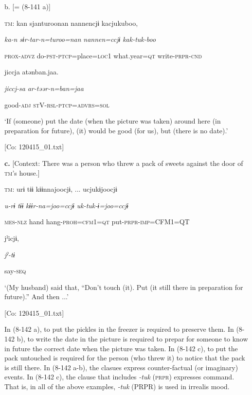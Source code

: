   b.  [= (8-141 a)]

    \textsc{tm}:  kan  sjanturoonan  {\textbar}nannen{\textbar}cjɨ  kacjukuboo,

      \textit{ka-n}  \textit{sɨr-tar-n=turoo=nan}  \textit{nannen=ccjɨ}  \textit{kak-tuk{}-boo}

      \textsc{prox}-\textsc{advz}  do-\textsc{pst}-\textsc{ptcp}=place=\textsc{loc}1  what.year=\textsc{qt}  write-\textsc{prpr}-\textsc{cnd}

      jiccja  atənban.jaa.  

      \textit{jiccj-sa}  \textit{ar-təər-n=ban=jaa}  

      good-\textsc{adj}  \textsc{st}V-\textsc{rsl}-\textsc{ptcp}=\textsc{advrs}=\textsc{sol}

      ‘If (someone) put the date (when the picture was taken) around here (in preparation for future), (it) would be good (for us), but (there is no date).’

      [Co: 120415\_01.txt]

  \textbf{c.}  [Context: There was a person who threw a pack of sweets against the door of \textsc{tm}’s house.]

    \textsc{tm}:  urɨ  tɨɨ  kɨɨnnajoocjɨ, ...  ucjukɨjoocjɨ

      \textit{u-rɨ}  \textit{tɨɨ}  \textit{kɨɨr-na=joo=ccjɨ}  \textit{uk-tuk{}-ɨ=joo=ccjɨ}

      \textsc{mes}-\textsc{nlz}  hand  hang-\textsc{proh}=\textsc{cfm}1=\textsc{qt}  put-\textsc{prpr}-\textsc{imp}=CFM1=QT

      jˀicjɨ,      

      \textit{jˀ-tɨ}      

      say-\textsc{seq}

      ‘(My husband) said that, “Don’t touch (it). Put (it still there in preparation for future).” And then ...’

      [Co: 120415\_01.txt]

In (8-142 a), to put the pickles in the freezer is required to preserve them. In (8-142 b), to write the date in the picture is required to prepar for someone to know in future the correct date when the picture was taken. In (8-142 c), to put the pack untouched is required for the person (who threw it) to notice that the pack is still there. In (8-142 a-b), the clasues express counter-factual (or imaginary) events. In (8-142 c), the clause that includes \textit{-tuk} (\textsc{prpr}) expresses command. That is, in all of the above examples, \textit{{}-tuk} (PRPR) is used in irrealis mood.

